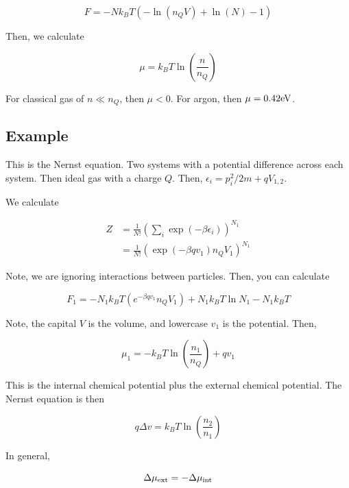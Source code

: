 \documentclass{article}
\newtheorem{one minute paper}[theorem]{One Minute Paper}
\begin{document}
\begin{equation}
    F = - Nk_B T \left( -\ln(n_Q V) + \ln(N) - 1  \right)
\end{equation}

Then, we calculate 

\begin{equation}
    \mu = k_B T \ln\left( \frac{n}{n_Q} \right)
\end{equation}

For classical gas of $n \ll n_Q$, then $\mu < 0$. For argon, then $\mu = 0.42\rm eV$. 

\subsection*{Example}

This is the Nernst equation. Two systems with a potential difference across each system. Then ideal gas with a charge $Q$. Then, $\epsilon_i = p_i^2/2m + qV_{1,2}$. 

We calculate 

\begin{align}
    Z &= \frac{1}{N!}\left( \sum_i \exp(-\beta \epsilon_i) \right)^{N_1} \\
    &= \frac{1}{N!}\left( \exp(-\beta q v_1)n_Q V_1 \right)^{N_1}
\end{align}

Note, we are ignoring interactions between particles. Then, you can calculate 

\begin{equation}
    F_1 = -N_1k_B T\left( e^{-\beta q v_1}n_Q V_1 \right) + N_1 k_B T\ln N_1 - N_1 k_B T 
\end{equation}

Note, the capital $V$ is the volume, and lowercase $v_1$ is the potential.
Then, 

\begin{equation}
    \mu_1 = -k_B T \ln\left( \frac{n_1}{n_Q}\right) + qv_1
\end{equation}

This is the internal chemical potential plus the external chemical potential. The Nernst equation is then 

\begin{equation}
    q\Delta v = k_B T \ln(\frac{n_2}{n_1})
\end{equation}

In general, 

\begin{equation}
    \Delta \mu_{\rm ext} = -\Delta \mu_{\rm int} 
\end{equation}
\end{document}
